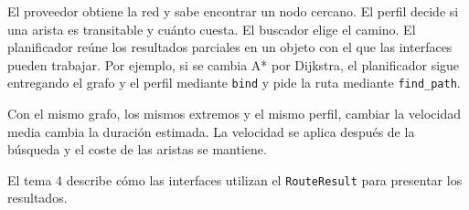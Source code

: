 \documentclass[11pt,a4paper]{article}
\begin{document}
El proveedor obtiene la red y sabe encontrar un nodo cercano. El perfil decide si una arista es transitable y cuánto cuesta. El buscador elige el camino. El planificador reúne los resultados parciales en un objeto con el que las interfaces pueden trabajar. Por ejemplo, si se cambia A* por Dijkstra, el planificador sigue entregando el grafo y el perfil mediante \texttt{bind} y pide la ruta mediante \texttt{find\_path}.

Con el mismo grafo, los mismos extremos y el mismo perfil, cambiar la velocidad media cambia la duración estimada. La velocidad se aplica después de la búsqueda y el coste de las aristas se mantiene.

El tema 4 describe cómo las interfaces utilizan el \texttt{RouteResult} para presentar los resultados.
\end{document}
